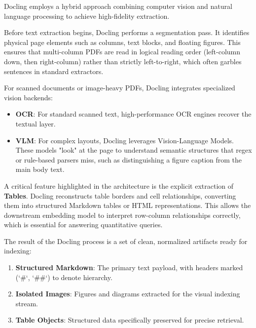 
Docling employs a hybrid approach combining computer vision and natural language processing to achieve high-fidelity extraction.


Before text extraction begins, Docling performs a segmentation pass. It identifies physical page elements such as columns, text blocks, and floating figures. This ensures that multi-column PDFs are read in logical reading order (left-column down, then right-column) rather than strictly left-to-right, which often garbles sentences in standard extractors.


For scanned documents or image-heavy PDFs, Docling integrates specialized vision backends:
\begin{itemize}
    \item \textbf{OCR}: For standard scanned text, high-performance OCR engines recover the textual layer.
    \item \textbf{VLM}: For complex layouts, Docling leverages Vision-Language Models. These models "look" at the page to understand semantic structures that regex or rule-based parsers miss, such as distinguishing a figure caption from the main body text.
\end{itemize}


A critical feature highlighted in the architecture is the explicit extraction of \textbf{Tables}. Docling reconstructs table borders and cell relationships, converting them into structured Markdown tables or HTML representations. This allows the downstream embedding model to interpret row-column relationships correctly, which is essential for answering quantitative queries.

The result of the Docling process is a set of clean, normalized artifacts ready for indexing:
\begin{enumerate}
    \item \textbf{Structured Markdown}: The primary text payload, with headers marked (`\#`, `\#\#`) to denote hierarchy.
    \item \textbf{Isolated Images}: Figures and diagrams extracted for the visual indexing stream.
    \item \textbf{Table Objects}: Structured data specifically preserved for precise retrieval.
\end{enumerate}

